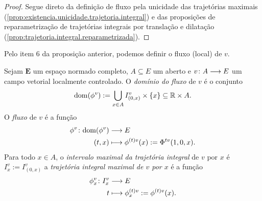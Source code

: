 \begin{proof}
Segue direto da definição de fluxo pela unicidade das trajetórias maximais (\ref{prop:existencia.unicidade.trajetoria.integral}) e das proposições de reparametrização de trajetórias integrais por translação e dilatação (\ref{prop:trajetoria.integral.reparametrizada}).

\begin{comment}

Notemos agora que, tomando $t_1 = 0$ no item 4 da proposição anterior, obtemos que, para todos $(t_0, x_0) \in \R \times A$ e todo $t \in \R$, vale que $(t, t_0, x_0) \in \dom(\Flux[v])$ se, e somente se, $(t-t_0, 0, x_0) \in \dom(\Flux[v])$ e, nesse caso,
	\begin{equation*}
	\Flux(t, t_0, x_0) = \Flux(t-t_0, 0, x_0).
	\end{equation*}
Isso também significa que $I^v_{(t_1,x_0)} = I^v_{(0,x_0)}+t_1$.  Além disso, pelo item 5 da proposição anterior, obtemos que, para todo $t \in \R \setminus \{0\}$ e todo $x_0 \in A$, vale que $(1, 0, x_0) \in \dom(\Flux[tv])$ se, e somente se, $(t, 0, x_0) \in \dom(\Flux[v])$ e, nesse caso,
	\begin{equation*}
	\Flux[tv](1, 0, x_0) = \Flux(t, 0, x_0).
	\end{equation*}

\end{comment}

\end{proof}

Pelo item 6 da proposição anterior, podemos definir o fluxo (local) de $v$.

\begin{definition}
Sejam $\bm E$ um espaço normado completo, $A \subseteq E$ um aberto e $\fun{v}{A}{E}$ um campo vetorial localmente controlado. O \emph{domínio do fluxo} de $v$ é o conjunto
	\begin{equation*}
	\dom(\flux^{v}) := \bigcup_{x \in A} I^v_{(0,x)} \times \{x\} \subseteq \R \times A.
	\end{equation*}
O \emph{fluxo} de $v$ é a função
	\begin{align*}
	\func{\flux^{v}}{\dom(\phi^v)}{E}{(t,x)}{\flux^{(t)v}(x) := \Flux[tv](1, 0, x).}
	\end{align*}
Para todo $x \in A$, o \emph{intervalo maximal da trajetória integral} de $v$ por $x$ é $I^v_x := I^v_{(0,x)}$ a \emph{trajetória integral maximal de $v$ por $x$} é a função
	\begin{align*}
	\func{\flux^{v}_x}{I^v_x}{E}{t}{\flux^{(t)v}_x := \flux^{(t)v}(x)}.
	\end{align*}
\end{definition}

